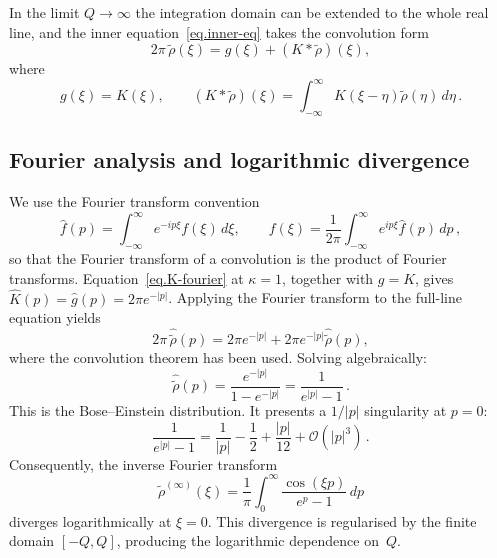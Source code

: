 \documentclass[11pt,a4paper]{article}
\newcommand{\rhot}{\tilde{\rho}}
\theoremstyle{definition}
\begin{document}
In the limit $Q\to\infty$ the integration
domain can be extended to the whole real line, and the inner equation~\eqref{eq.inner-eq}
takes the convolution form
\begin{equation}
2\pi\,\tilde{\rho}(\xi)
=
g(\xi)+(K*\tilde{\rho})(\xi),
\end{equation}
where
\begin{equation}
    g(\xi)=K(\xi), \qquad    (K*\tilde{\rho})(\xi) = \int_{-\infty}^{\infty}
K(\xi-\eta)\tilde{\rho}(\eta)\,d\eta\, .
\end{equation}

\subsection{Fourier analysis and logarithmic divergence}
We use the Fourier transform convention
\begin{equation}
\widehat{f}(p)
=
\int_{-\infty}^{\infty} e^{-ip\xi}f(\xi)\,d\xi,
\qquad
f(\xi)
=
\frac{1}{2\pi}
\int_{-\infty}^{\infty}e^{ip\xi}\widehat{f}(p)\,dp\,,
\end{equation}
so that the Fourier transform of a convolution is the product of Fourier transforms.
Equation~\eqref{eq.K-fourier} at $\kappa=1$, together with $g=K$, gives
$\widehat{K}(p)=\widehat{g}(p)=2\pi e^{-|p|}$.
Applying the Fourier transform to the full-line equation yields
\begin{equation}
2\pi\,\hat{\tilde{\rho}}(p)
=
2\pi e^{-|p|}
+
2\pi e^{-|p|}
\hat{\tilde{\rho}}(p),
\end{equation}
where the convolution theorem has been used.
Solving algebraically:
\begin{equation}\label{eq.BE-distribution}
\hat{\tilde{\rho}}(p)
=
\frac{e^{-|p|}}{1-e^{-|p|}}
=
\frac{1}{e^{|p|}-1}\,.
\end{equation}
This is the Bose--Einstein distribution.
It presents a $1/|p|$ singularity at $p=0$:
\begin{equation}\label{eq.BE-smallp}
\frac{1}{e^{|p|}-1}
=
\frac{1}{|p|}
-\frac{1}{2}
+\frac{|p|}{12}
+\mathcal O\left(|p|^3\right)\,.
\end{equation}
Consequently, the inverse Fourier transform
\begin{equation}\label{eq.rho_xi_cos}
\rhot^{(\infty)}(\xi) = \frac{1}{\pi}\int_0^{\infty}\frac{\cos(\xi p)}{e^p-1}\,dp
\end{equation}
diverges logarithmically at $\xi=0$.
This divergence is regularised by the finite domain $[-Q,Q]$, producing the logarithmic dependence on~$Q$.
\end{document}
